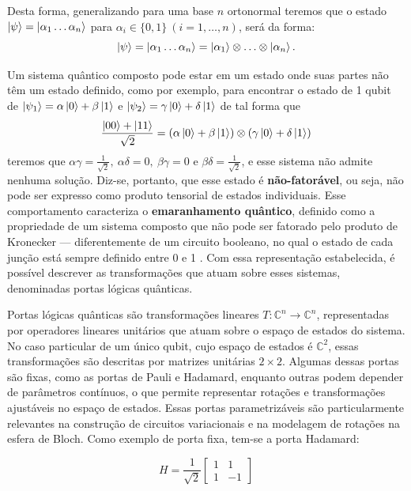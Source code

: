 Desta forma, generalizando para uma base $n$ ortonormal teremos que o estado $\ket{\psi}=\ket{\alpha_1\dots\alpha_n}$ para $\alpha_i\in \{0,1\}\ (i=1,\hdots,n)$, será da forma:
$$
    \ket{\psi}=\ket{\alpha_1\hdots\alpha_n}=\ket{\alpha_1}\otimes\hdots\otimes\ket{\alpha_n}.
$$

{\red
Um sistema quântico composto pode estar em um estado onde suas partes não têm um estado definido, como por exemplo, para encontrar o estado de 1 qubit de $\ket{\psi_1}=\alpha\ket{0}+\beta\ket{1}$ e $\ket{\psi_2}=\gamma\ket{0}+\delta\ket{1}$ de tal forma que
\begin{equation}
    \label{eq:estado_bell}
    \dfrac{\ket{00}+\ket{11}}{\sqrt{2}}=(\alpha\ket{0}+\beta\ket{1})\otimes(\gamma\ket{0}+\delta\ket{1})
\end{equation}
teremos que $\alpha\gamma = \frac{1}{\sqrt{2}},\ \alpha\delta=0,\ \beta\gamma=0$ e $\beta\delta=\frac{1}{\sqrt{2}}$, e esse sistema não admite nenhuma solução. Diz-se, portanto, que esse estado é \textbf{não-fatorável}, ou seja, não pode ser expresso como produto tensorial de estados individuais. Esse comportamento caracteriza o \textbf{emaranhamento quântico}, definido como a propriedade de um sistema composto que não pode ser fatorado pelo produto de Kronecker — diferentemente de um circuito booleano, no qual o estado de cada junção está sempre definido entre 0 e 1 \cite{Marquezino2019, lipton_quantum_2014}. Com essa representação estabelecida, é possível descrever as transformações que atuam sobre esses sistemas, denominadas portas lógicas quânticas.}

{\red Portas lógicas quânticas são transformações lineares \(T:\mathbb{C}^n \rightarrow \mathbb{C}^n\), representadas por operadores lineares unitários que atuam sobre o espaço de estados do sistema. No caso particular de um único qubit, cujo espaço de estados é \(\mathbb{C}^2\), essas transformações são descritas por matrizes unitárias \(2\times 2\). Algumas dessas portas são fixas, como as portas de Pauli e Hadamard, enquanto outras podem depender de parâmetros contínuos, o que permite representar rotações e transformações ajustáveis no espaço de estados. Essas portas parametrizáveis são particularmente relevantes na construção de circuitos variacionais e na modelagem de rotações na esfera de Bloch. Como exemplo de porta fixa, tem-se a porta Hadamard: }

$$
    \label{eq:hadamard}
    H=\dfrac{1}{\sqrt{2}}\left[\begin{array}{cc}
            1 & 1 \\
            1 & -1
    \end{array}\right]
$$

